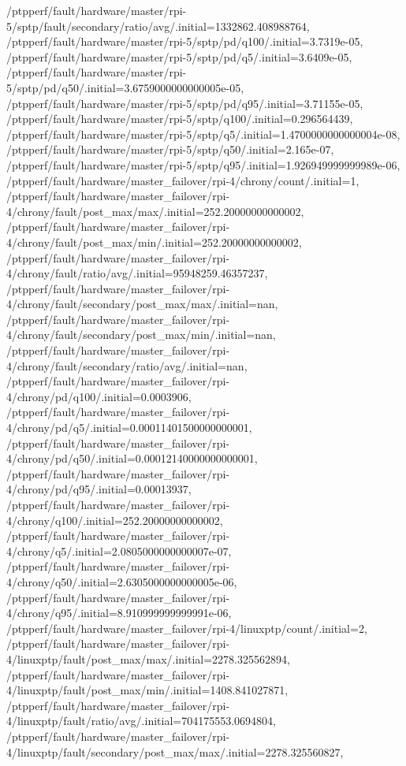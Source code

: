 {    /ptpperf/fault/hardware/master/rpi-5/sptp/fault/secondary/ratio/avg/.initial=1332862.408988764,
    /ptpperf/fault/hardware/master/rpi-5/sptp/pd/q100/.initial=3.7319e-05,
    /ptpperf/fault/hardware/master/rpi-5/sptp/pd/q5/.initial=3.6409e-05,
    /ptpperf/fault/hardware/master/rpi-5/sptp/pd/q50/.initial=3.6759000000000005e-05,
    /ptpperf/fault/hardware/master/rpi-5/sptp/pd/q95/.initial=3.71155e-05,
    /ptpperf/fault/hardware/master/rpi-5/sptp/q100/.initial=0.296564439,
    /ptpperf/fault/hardware/master/rpi-5/sptp/q5/.initial=1.4700000000000004e-08,
    /ptpperf/fault/hardware/master/rpi-5/sptp/q50/.initial=2.165e-07,
    /ptpperf/fault/hardware/master/rpi-5/sptp/q95/.initial=1.926949999999989e-06,
    /ptpperf/fault/hardware/master_failover/rpi-4/chrony/count/.initial=1,
    /ptpperf/fault/hardware/master_failover/rpi-4/chrony/fault/post_max/max/.initial=252.20000000000002,
    /ptpperf/fault/hardware/master_failover/rpi-4/chrony/fault/post_max/min/.initial=252.20000000000002,
    /ptpperf/fault/hardware/master_failover/rpi-4/chrony/fault/ratio/avg/.initial=95948259.46357237,
    /ptpperf/fault/hardware/master_failover/rpi-4/chrony/fault/secondary/post_max/max/.initial=nan,
    /ptpperf/fault/hardware/master_failover/rpi-4/chrony/fault/secondary/post_max/min/.initial=nan,
    /ptpperf/fault/hardware/master_failover/rpi-4/chrony/fault/secondary/ratio/avg/.initial=nan,
    /ptpperf/fault/hardware/master_failover/rpi-4/chrony/pd/q100/.initial=0.0003906,
    /ptpperf/fault/hardware/master_failover/rpi-4/chrony/pd/q5/.initial=0.00011401500000000001,
    /ptpperf/fault/hardware/master_failover/rpi-4/chrony/pd/q50/.initial=0.00012140000000000001,
    /ptpperf/fault/hardware/master_failover/rpi-4/chrony/pd/q95/.initial=0.00013937,
    /ptpperf/fault/hardware/master_failover/rpi-4/chrony/q100/.initial=252.20000000000002,
    /ptpperf/fault/hardware/master_failover/rpi-4/chrony/q5/.initial=2.0805000000000007e-07,
    /ptpperf/fault/hardware/master_failover/rpi-4/chrony/q50/.initial=2.6305000000000005e-06,
    /ptpperf/fault/hardware/master_failover/rpi-4/chrony/q95/.initial=8.910999999999991e-06,
    /ptpperf/fault/hardware/master_failover/rpi-4/linuxptp/count/.initial=2,
    /ptpperf/fault/hardware/master_failover/rpi-4/linuxptp/fault/post_max/max/.initial=2278.325562894,
    /ptpperf/fault/hardware/master_failover/rpi-4/linuxptp/fault/post_max/min/.initial=1408.841027871,
    /ptpperf/fault/hardware/master_failover/rpi-4/linuxptp/fault/ratio/avg/.initial=704175553.0694804,
    /ptpperf/fault/hardware/master_failover/rpi-4/linuxptp/fault/secondary/post_max/max/.initial=2278.325560827,
}
